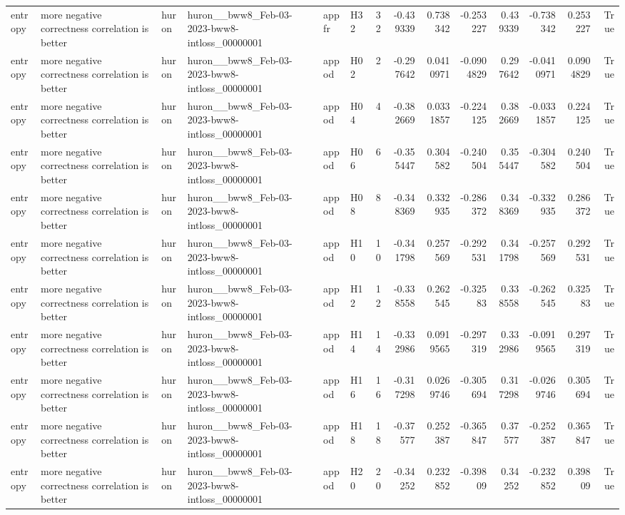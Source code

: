\begin{longtable}{llllllrrrrrrrr}
entropy & more negative correctness correlation is better & huron & huron\_\_bww8\_Feb-03-2023-bww8-intloss\_00000001 & appfr & H32 & 32 & -0.439339 & 0.738342 & -0.253227 & 0.439339 & -0.738342 & 0.253227 & True \\
entropy & more negative correctness correlation is better & huron & huron\_\_bww8\_Feb-03-2023-bww8-intloss\_00000001 & appod & H02 & 2 & -0.297642 & 0.0410971 & -0.0904829 & 0.297642 & -0.0410971 & 0.0904829 & True \\
entropy & more negative correctness correlation is better & huron & huron\_\_bww8\_Feb-03-2023-bww8-intloss\_00000001 & appod & H04 & 4 & -0.382669 & 0.0331857 & -0.224125 & 0.382669 & -0.0331857 & 0.224125 & True \\
entropy & more negative correctness correlation is better & huron & huron\_\_bww8\_Feb-03-2023-bww8-intloss\_00000001 & appod & H06 & 6 & -0.355447 & 0.304582 & -0.240504 & 0.355447 & -0.304582 & 0.240504 & True \\
entropy & more negative correctness correlation is better & huron & huron\_\_bww8\_Feb-03-2023-bww8-intloss\_00000001 & appod & H08 & 8 & -0.348369 & 0.332935 & -0.286372 & 0.348369 & -0.332935 & 0.286372 & True \\
entropy & more negative correctness correlation is better & huron & huron\_\_bww8\_Feb-03-2023-bww8-intloss\_00000001 & appod & H10 & 10 & -0.341798 & 0.257569 & -0.292531 & 0.341798 & -0.257569 & 0.292531 & True \\
entropy & more negative correctness correlation is better & huron & huron\_\_bww8\_Feb-03-2023-bww8-intloss\_00000001 & appod & H12 & 12 & -0.338558 & 0.262545 & -0.32583 & 0.338558 & -0.262545 & 0.32583 & True \\
entropy & more negative correctness correlation is better & huron & huron\_\_bww8\_Feb-03-2023-bww8-intloss\_00000001 & appod & H14 & 14 & -0.332986 & 0.0919565 & -0.297319 & 0.332986 & -0.0919565 & 0.297319 & True \\
entropy & more negative correctness correlation is better & huron & huron\_\_bww8\_Feb-03-2023-bww8-intloss\_00000001 & appod & H16 & 16 & -0.317298 & 0.0269746 & -0.305694 & 0.317298 & -0.0269746 & 0.305694 & True \\
entropy & more negative correctness correlation is better & huron & huron\_\_bww8\_Feb-03-2023-bww8-intloss\_00000001 & appod & H18 & 18 & -0.37577 & 0.252387 & -0.365847 & 0.37577 & -0.252387 & 0.365847 & True \\
entropy & more negative correctness correlation is better & huron & huron\_\_bww8\_Feb-03-2023-bww8-intloss\_00000001 & appod & H20 & 20 & -0.34252 & 0.232852 & -0.39809 & 0.34252 & -0.232852 & 0.39809 & True \\

\end{longtable}
